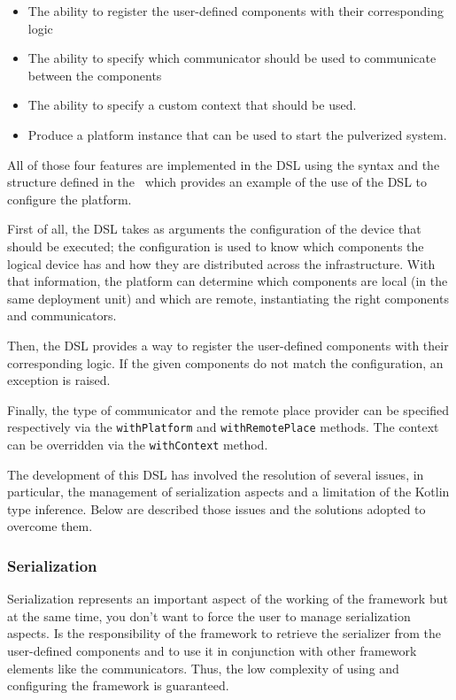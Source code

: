 \begin{itemize}
	\item The ability to register the user-defined components with their corresponding logic
	\item The ability to specify which communicator should be used to communicate between the components
	\item The ability to specify a custom context that should be used.
	\item Produce a platform instance that can be used to start the pulverized system.
\end{itemize}

All of those four features are implemented in the DSL using the syntax and the structure defined in the~ which provides
an example of the use of the DSL to configure the platform.



First of all, the DSL takes as arguments the configuration of the device that should be executed; the configuration is used to know which components
the logical device has and how they are distributed across the infrastructure. With that information, the platform can determine which components
are local (in the same deployment unit) and which are remote, instantiating the right components and communicators.

Then, the DSL provides a way to register the user-defined components with their corresponding logic. If the given components do not match the
configuration, an exception is raised.

Finally, the type of communicator and the remote place provider can be specified respectively via the \texttt{withPlatform} and
\texttt{withRemotePlace} methods. The context can be overridden via the \texttt{withContext} method.

The development of this DSL has involved the resolution of several issues, in particular, the management of serialization aspects and a limitation of
the Kotlin type inference. Below are described those issues and the solutions adopted to overcome them.

\subsubsection{Serialization}

Serialization represents an important aspect of the working of the framework but at the same time, you don't want to force the user to manage
serialization aspects. Is the responsibility of the framework to retrieve the serializer from the user-defined components and to use it in
conjunction with other framework elements like the communicators. Thus, the low complexity of using and configuring the framework is guaranteed.

